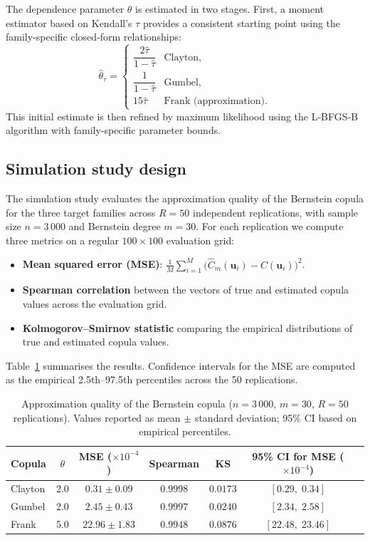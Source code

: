 The dependence parameter \(\theta\) is estimated in two stages. First, a moment estimator based on Kendall's \(\tau\) provides a consistent starting point using the family‑specific closed‑form relationships:
\[
\hat{\theta}_{\tau} = \begin{cases}
\dfrac{2\hat{\tau}}{1-\hat{\tau}} & \text{Clayton},\\[6pt]
\dfrac{1}{1-\hat{\tau}}           & \text{Gumbel},\\[6pt]
15\hat{\tau}                      & \text{Frank (approximation)}.
\end{cases}
\]
This initial estimate is then refined by maximum likelihood using the L‑BFGS‑B algorithm with family‑specific parameter bounds.

\subsection{Simulation study design}

The simulation study evaluates the approximation quality of the Bernstein copula for the three target families across \(R=50\) independent replications, with sample size \(n=3\,000\) and Bernstein degree \(m=30\). For each replication we compute three metrics on a regular \(100\times100\) evaluation grid:
\begin{itemize}
\item \textbf{Mean squared error (MSE)}: \(\frac{1}{M}\sum_{i=1}^M \bigl(\hat{C}_m(\mathbf{u}_i)-C(\mathbf{u}_i)\bigr)^2\).
\item \textbf{Spearman correlation} between the vectors of true and estimated copula values across the evaluation grid.
\item \textbf{Kolmogorov–Smirnov statistic} comparing the empirical distributions of true and estimated copula values.
\end{itemize}

Table~\ref{tab:metrics} summarises the results. Confidence intervals for the MSE are computed as the empirical 2.5th–97.5th percentiles across the 50 replications.

\begin{table}[H]
\centering
\caption{Approximation quality of the Bernstein copula (\(n=3\,000\), \(m=30\), \(R=50\) replications). Values reported as mean \(\pm\) standard deviation; 95\% CI based on empirical percentiles.}
\label{tab:metrics}
\begin{tabular}{lcccccc}
\toprule
Copula & \(\theta\) & MSE (\(\times10^{-4}\)) & Spearman & KS & 95\% CI for MSE (\(\times10^{-4}\)) \\
\midrule
Clayton & 2.0 & \(0.31 \pm 0.09\) & \(0.9998\) & \(0.0173\) & \([0.29,\;0.34]\) \\
Gumbel  & 2.0 & \(2.45 \pm 0.43\) & \(0.9997\) & \(0.0240\) & \([2.34,\;2.58]\) \\
Frank   & 5.0 & \(22.96 \pm 1.83\) & \(0.9948\) & \(0.0876\) & \([22.48,\;23.46]\) \\
\bottomrule
\end{tabular}
\end{table}

